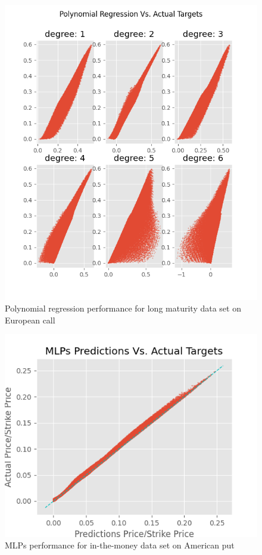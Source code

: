 \begin{figure}[th]
\centering
\includegraphics{Figures/polynomialLongTEuroC.png}
\decoRule
\caption[Polynomial Regression Performance for Long Maturity Data Set European Call]{Polynomial regression performance for long maturity data set on European call}
\label{fig:MLPsEuroCLongMaturity}
\end{figure}


\begin{figure}[th]
\centering
\includegraphics{Figures/outMoneyAmerP.png}
\decoRule
\caption[MLPs Performance for In-the-Money Data Set American Put]{MLPs performance for in-the-money data set on American put}
\label{fig:MLPsAmerPOutMoney}
\end{figure}

